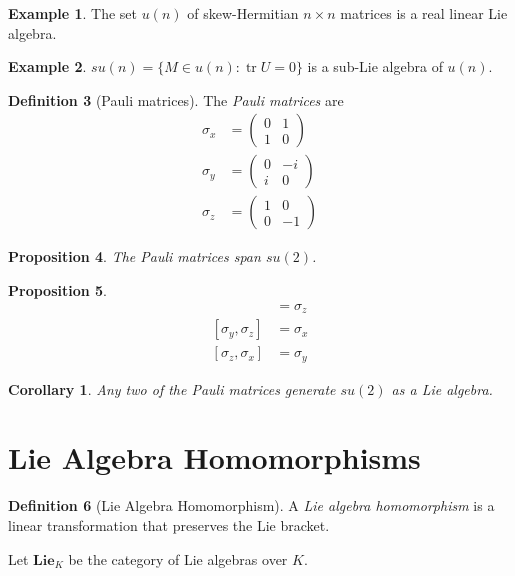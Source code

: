 \documentclass{book}
\newtheorem{prop}{Proposition}[chapter]
\newtheorem{cor}{Corollary}[prop]
\theoremstyle{definition}
\newtheorem{df}[prop]{Definition}
\newtheorem{ex}[prop]{Example}
\newcommand{\tr}{\ensuremath{\operatorname{tr}}}
\begin{document}
\begin{ex}
The set $u(n)$ of skew-Hermitian $n \times n$ matrices is a real linear Lie algebra.
\end{ex}

\begin{ex}
$su(n) = \{ M \in u(n) : \tr U = 0 \}$ is a sub-Lie algebra of $u(n)$.
\end{ex}

\begin{df}[Pauli matrices]
The \emph{Pauli matrices} are
\begin{align*}
\sigma_x & = \left( \begin{array}{cc}
0 & 1 \\ 1 & 0
\end{array} \right) \\
\sigma_y & = \left( \begin{array}{cc}
0 & -i \\ i & 0
\end{array} \right) \\
\sigma_z & = \left( \begin{array}{cc}
1 & 0 \\ 0 & -1
\end{array} \right)
\end{align*}
\end{df}

\begin{prop}
The Pauli matrices span $su(2)$.
\end{prop}

\begin{prop}
\begin{align*}
[\sigma_x, \sigma_y] & = \sigma_z \\
[\sigma_y, \sigma_z] & = \sigma_x \\
[\sigma_z, \sigma_x] & = \sigma_y
\end{align*}
\end{prop}

\begin{cor}
Any two of the Pauli matrices generate $su(2)$ as a Lie algebra.
\end{cor}

\section{Lie Algebra Homomorphisms}

\begin{df}[Lie Algebra Homomorphism]
A \emph{Lie algebra homomorphism} is a linear transformation that preserves the Lie bracket.

Let $\mathbf{Lie}_K$ be the category of Lie algebras over $K$.
\end{df}
\end{document}

